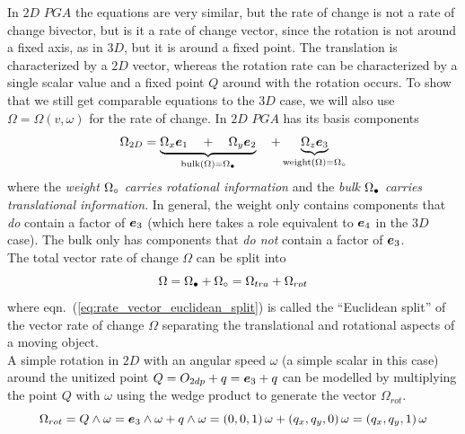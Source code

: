 \newpage

In $2D$ $PGA$ the equations are very similar, but the rate of change is not a rate of
change bivector, but is it a rate of change vector, since the rotation is not around a
fixed axis, as in $3D$, but it is around a fixed point. The translation is characterized
by a $2D$ vector, whereas the rotation rate can be characterized by a single scalar value
and a fixed point $Q$ around with the rotation occurs. To show that we still get
comparable equations to the $3D$ case, we will also use $\Omega = \Omega(v, \omega)$ for
the rate of change. In $2D$ $PGA$ has its basis components
\begin{equation}
   \Omega_{2D} = \underbrace{\Omega_x \bm{e}_{1} \quad
               + \quad \Omega_y \bm{e}_{2}}_{\text{bulk($\Omega$)}
               =  {\Omega}_\bullet} \quad
               + \underbrace{\Omega_z \bm{e}_{3}}_{\text{weight($\Omega$)}
               = {\Omega}_\circ}
   \label{eq:rate_vector_component_definition}
\end{equation}
where the \emph{weight ${\Omega}_\circ$ carries rotational information} and the
\emph{bulk ${\Omega}_\bullet$ carries translational information}. In general, the weight only
contains components that \emph{do} contain a factor of $\bm{e}_{3}$ (which here takes a role
equivalent to $\bm{e}_{4}$ in the $3D$ case). The bulk only has components that \emph{do not}
contain a factor of $\bm{e}_{3}$.\\

The total vector rate of change $\Omega$ can be split into
\begin{equation}
   \Omega = {\Omega}_\bullet + {\Omega}_\circ = \Omega_{tra} + \Omega_{rot}
   \label{eq:rate_vector_euclidean_split}
\end{equation}
where eqn.~(\ref{eq:rate_vector_euclidean_split}) is called the ``Euclidean split'' of the
vector rate of change $\Omega$ separating the translational and rotational aspects of a
moving object. \\

A simple rotation in $2D$ with an angular speed $\omega$ (a simple scalar in this case)
around the unitized point $Q = O_{2dp} + q = \bm{e}_{3} + q$ can be modelled by multiplying
the point $Q$ with $\omega$ using the wedge product to generate the vector $\Omega_{rot}$.
\begin{equation}
   \Omega_{rot} = Q \wedge \omega = \bm{e}_{3} \wedge \omega + q \wedge \omega
                = (0, 0, 1)\,\omega  + (q_x, q_y, 0)\,\omega 
                = (q_x, q_y, 1)\,\omega
   \label{eq:vector_rot_rate_omega}
\end{equation}

